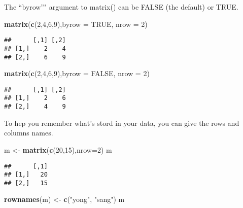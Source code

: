 \documentclass[
]{article}
\newenvironment{Shaded}{\begin{snugshade}}{\end{snugshade}}
\newcommand{\DataTypeTok}[1]{\textcolor[rgb]{0.13,0.29,0.53}{#1}}
\newcommand{\DecValTok}[1]{\textcolor[rgb]{0.00,0.00,0.81}{#1}}
\newcommand{\KeywordTok}[1]{\textcolor[rgb]{0.13,0.29,0.53}{\textbf{#1}}}
\newcommand{\NormalTok}[1]{#1}
\newcommand{\OtherTok}[1]{\textcolor[rgb]{0.56,0.35,0.01}{#1}}
\newcommand{\StringTok}[1]{\textcolor[rgb]{0.31,0.60,0.02}{#1}}
\begin{document}
The ``byrow''" argument to matrix() can be FALSE (the default) or TRUE.

\begin{Shaded}
\begin{Highlighting}[]
\KeywordTok{matrix}\NormalTok{(}\KeywordTok{c}\NormalTok{(}\DecValTok{2}\NormalTok{,}\DecValTok{4}\NormalTok{,}\DecValTok{6}\NormalTok{,}\DecValTok{9}\NormalTok{),}\DataTypeTok{byrow =} \OtherTok{TRUE}\NormalTok{, }\DataTypeTok{nrow =} \DecValTok{2}\NormalTok{)}
\end{Highlighting}
\end{Shaded}

\begin{verbatim}
##      [,1] [,2]
## [1,]    2    4
## [2,]    6    9
\end{verbatim}

\begin{Shaded}
\begin{Highlighting}[]
\KeywordTok{matrix}\NormalTok{(}\KeywordTok{c}\NormalTok{(}\DecValTok{2}\NormalTok{,}\DecValTok{4}\NormalTok{,}\DecValTok{6}\NormalTok{,}\DecValTok{9}\NormalTok{),}\DataTypeTok{byrow =} \OtherTok{FALSE}\NormalTok{, }\DataTypeTok{nrow =} \DecValTok{2}\NormalTok{)}
\end{Highlighting}
\end{Shaded}

\begin{verbatim}
##      [,1] [,2]
## [1,]    2    6
## [2,]    4    9
\end{verbatim}

To hep you remember what's stord in your data, you can give the rows and
columns names.

\begin{Shaded}
\begin{Highlighting}[]
\NormalTok{m <-}\StringTok{ }\KeywordTok{matrix}\NormalTok{(}\KeywordTok{c}\NormalTok{(}\DecValTok{20}\NormalTok{,}\DecValTok{15}\NormalTok{),}\DataTypeTok{nrow=}\DecValTok{2}\NormalTok{)}
\NormalTok{m}
\end{Highlighting}
\end{Shaded}

\begin{verbatim}
##      [,1]
## [1,]   20
## [2,]   15
\end{verbatim}

\begin{Shaded}
\begin{Highlighting}[]
\KeywordTok{rownames}\NormalTok{(m) <-}\StringTok{ }\KeywordTok{c}\NormalTok{(}\StringTok{"yong"}\NormalTok{, }\StringTok{"sang"}\NormalTok{)}
\NormalTok{m}
\end{Highlighting}
\end{Shaded}
\end{document}
